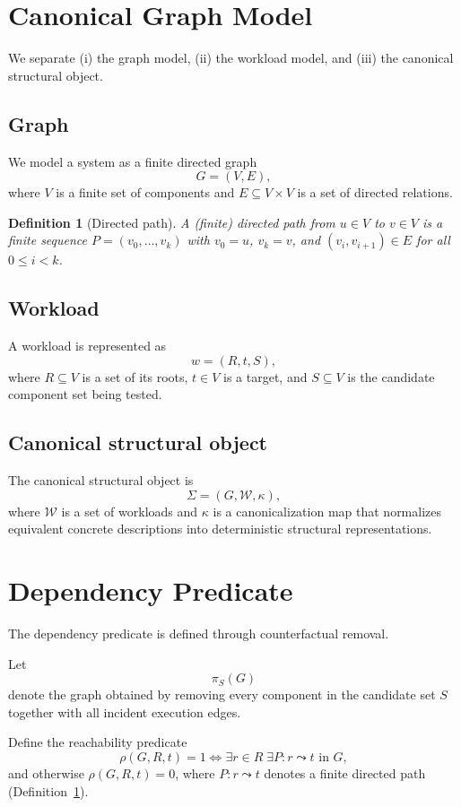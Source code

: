 \documentclass[11pt]{article}
\newtheorem{definition}{Definition}
\begin{document}
\section{Canonical Graph Model}
\label{sec:graph-model}
We separate (i) the graph model, (ii) the workload model, and (iii) the canonical structural object.

\subsection{Graph}
We model a system as a finite directed graph
\[
G=(V,E),
\]
where \(V\) is a finite set of components and \(E\subseteq V\times V\) is a set of directed relations.

\begin{definition}[Directed path]
\label{def:directed-path}
A (finite) directed path from \(u\in V\) to \(v\in V\) is a finite sequence
\(P=(v_0,\dots,v_k)\) with \(v_0=u\), \(v_k=v\), and \((v_i,v_{i+1})\in E\) for all \(0\le i<k\).
\end{definition}

\subsection{Workload}
A workload is represented as
\[
w=(R,t,S),
\]
where \(R\subseteq V\) is a set of its roots, \(t\in V\) is a target, and \(S\subseteq V\) is the candidate component set being tested.

\subsection{Canonical structural object}
The canonical structural object is
\[
\Sigma=(G,\mathcal{W},\kappa),
\]
where \(\mathcal{W}\) is a set of workloads and \(\kappa\) is a canonicalization map that normalizes equivalent concrete descriptions into deterministic structural representations.
\section{Dependency Predicate}
\label{sec:dependency-predicate}
The dependency predicate is defined through counterfactual removal.

Let
\[
\pi_S(G)
\]
denote the graph obtained by removing every component in the candidate
set \(S\) together with all incident execution edges.

Define the reachability predicate
\[
\rho(G,R,t)=1
\iff
\exists r\in R\;\exists P:r\leadsto t\text{ in }G,
\]
and otherwise \(\rho(G,R,t)=0\), where \(P:r\leadsto t\) denotes a finite directed path (Definition~\ref{def:directed-path}).
\end{document}
